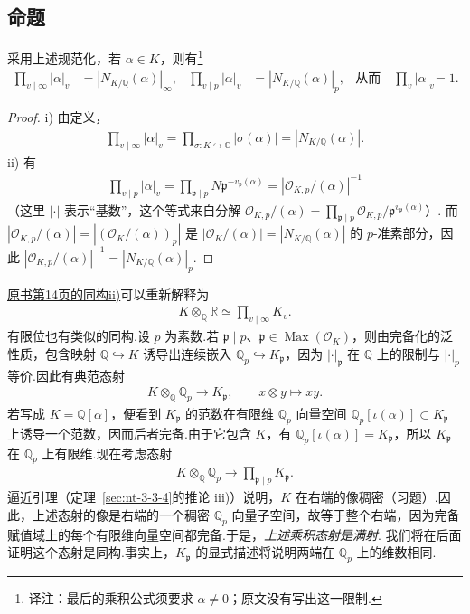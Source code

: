 \subsection{命题}\label{sec:nt-4-1-7}
\begin{proposition*}
采用上述规范化，若 $\alpha\in K$，则有\footnote{译注：最后的乘积公式须要求 $\alpha\ne0$；原文没有写出这一限制.}
\begin{align*}
\prod_{v\mid\infty}|\alpha|_v&=|N_{K/\mathbb Q}(\alpha)|_\infty,
&\prod_{v\mid p}|\alpha|_v&=|N_{K/\mathbb Q}(\alpha)|_p,
&\text{从而}\quad\prod_v|\alpha|_v&=1.
\end{align*}
\end{proposition*}
\begin{proof}
\textup{i)} 由定义，
\begin{align*}
\prod_{v\mid\infty}|\alpha|_v=\prod_{\sigma\colon K\hookrightarrow\mathbb C}|\sigma(\alpha)|=|N_{K/\mathbb Q}(\alpha)|.
\end{align*}
\textup{ii)} 有
\begin{align*}
\prod_{v\mid p}|\alpha|_v
=\prod_{\mathfrak p\mid p}N\mathfrak p^{-v_{\mathfrak p}(\alpha)}
=|\mathcal O_{K,p}/(\alpha)|^{-1}
\end{align*}
（这里 $|\cdot|$ 表示``基数''，这个等式来自分解 $\mathcal O_{K,p}/(\alpha)=\prod_{\mathfrak p\mid p}\mathcal O_{K,p}/\mathfrak p^{v_{\mathfrak p}(\alpha)}$）.
而 $|\mathcal O_{K,p}/(\alpha)|=|(\mathcal O_K/(\alpha))_p|$ 是 $|\mathcal O_K/(\alpha)|=|N_{K/\mathbb Q}(\alpha)|$ 的 $p$-准素部分，因此 $|\mathcal O_{K,p}/(\alpha)|^{-1}=|N_{K/\mathbb Q}(\alpha)|_p$.
\end{proof}
\begin{remark*}
\hyperref[item:nt-2-1-6-real]{原书第14页的同构ii)}可以重新解释为
\begin{align*}
K\otimes_{\mathbb Q}\mathbb R\simeq\prod_{v\mid\infty}K_v.
\end{align*}
有限位也有类似的同构.设 $p$ 为素数.若 $\mathfrak p\mid p$、$\mathfrak p\in\operatorname{Max}(\mathcal O_K)$，则由完备化的泛性质，包含映射 $\mathbb Q\hookrightarrow K$ 诱导出连续嵌入 $\mathbb Q_p\hookrightarrow K_{\mathfrak p}$，因为 $|\cdot|_{\mathfrak p}$ 在 $\mathbb Q$ 上的限制与 $|\cdot|_p$ 等价.因此有典范态射
\begin{align*}
K\otimes_{\mathbb Q}\mathbb Q_p\longrightarrow K_{\mathfrak p},\qquad x\otimes y\longmapsto xy.
\end{align*}
若写成 $K=\mathbb Q[\alpha]$，便看到 $K_{\mathfrak p}$ 的范数在有限维 $\mathbb Q_p$ 向量空间 $\mathbb Q_p[\iota(\alpha)]\subset K_{\mathfrak p}$ 上诱导一个范数，因而后者完备.由于它包含 $K$，有 $\mathbb Q_p[\iota(\alpha)]=K_{\mathfrak p}$，所以 $K_{\mathfrak p}$ 在 $\mathbb Q_p$ 上有限维.现在考虑态射
\begin{align*}
K\otimes_{\mathbb Q}\mathbb Q_p\longrightarrow\prod_{\mathfrak p\mid p}K_{\mathfrak p}.
\end{align*}
逼近引理（定理~\ref{sec:nt-3-3-4}的推论 iii)）说明，$K$ 在右端的像稠密（习题）.因此，上述态射的像是右端的一个稠密 $\mathbb Q_p$ 向量子空间，故等于整个右端，因为完备赋值域上的每个有限维向量空间都完备.于是，\emph{上述乘积态射是满射}.
我们将在后面证明这个态射是同构.事实上，$K_{\mathfrak p}$ 的显式描述将说明两端在 $\mathbb Q_p$ 上的维数相同.
\end{remark*}
